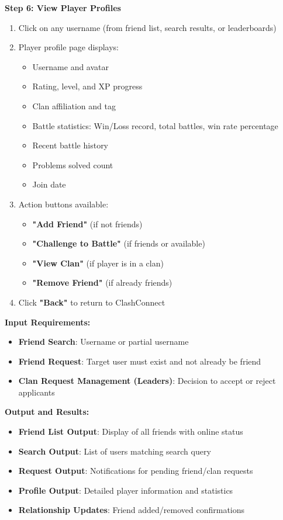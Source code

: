 \documentclass[12pt,a4paper]{article}
\begin{document}
\textbf{Step 6: View Player Profiles}
\begin{enumerate}
\item Click on any username (from friend list, search results, or leaderboards)
\item Player profile page displays:
  \begin{itemize}
    \item Username and avatar
    \item Rating, level, and XP progress
    \item Clan affiliation and tag
    \item Battle statistics: Win/Loss record, total battles, win rate percentage
    \item Recent battle history
    \item Problems solved count
    \item Join date
  \end{itemize}
\item Action buttons available:
  \begin{itemize}
    \item \textbf{"Add Friend"} (if not friends)
    \item \textbf{"Challenge to Battle"} (if friends or available)
    \item \textbf{"View Clan"} (if player is in a clan)
    \item \textbf{"Remove Friend"} (if already friends)
  \end{itemize}
\item Click \textbf{"Back"} to return to ClashConnect
\end{enumerate}

\textbf{Input Requirements:}
\begin{itemize}[leftmargin=1.8em]
\item \textbf{Friend Search}: Username or partial username
\item \textbf{Friend Request}: Target user must exist and not already be friend
\item \textbf{Clan Request Management (Leaders)}: Decision to accept or reject applicants
\end{itemize}

\textbf{Output and Results:}
\begin{itemize}[leftmargin=1.8em]
\item \textbf{Friend List Output}: Display of all friends with online status
\item \textbf{Search Output}: List of users matching search query
\item \textbf{Request Output}: Notifications for pending friend/clan requests
\item \textbf{Profile Output}: Detailed player information and statistics
\item \textbf{Relationship Updates}: Friend added/removed confirmations
\end{itemize}
\end{document}

